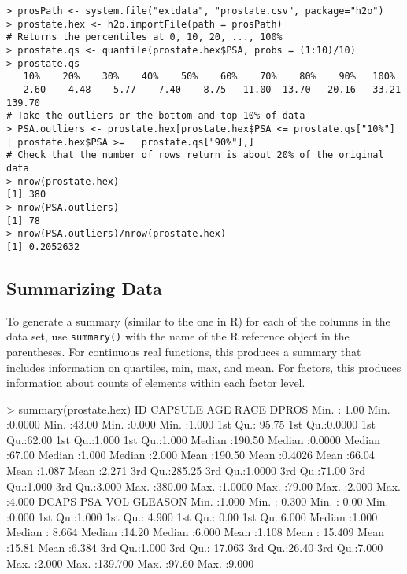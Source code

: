 \begin{lstlisting}[style=R]
> prosPath <- system.file("extdata", "prostate.csv", package="h2o")
> prostate.hex <- h2o.importFile(path = prosPath)
# Returns the percentiles at 0, 10, 20, ..., 100%
> prostate.qs <- quantile(prostate.hex$PSA, probs = (1:10)/10)
> prostate.qs
   10%    20%    30%    40%    50%    60%    70%    80%    90%   100% 
   2.60    4.48    5.77    7.40    8.75   11.00  13.70   20.16   33.21  139.70 
# Take the outliers or the bottom and top 10% of data
> PSA.outliers <- prostate.hex[prostate.hex$PSA <= prostate.qs["10%"] | prostate.hex$PSA >=   prostate.qs["90%"],]
# Check that the number of rows return is about 20% of the original data
> nrow(prostate.hex)
[1] 380
> nrow(PSA.outliers)
[1] 78
> nrow(PSA.outliers)/nrow(prostate.hex)
[1] 0.2052632
\end{lstlisting}


\subsection{Summarizing Data}
To generate a summary (similar to the one in R) for each of the columns in the data set, use {\texttt{summary()}} with the name of the R reference object in the parentheses.
For continuous real functions, this produces a summary that includes information on quartiles, min, max, and mean. 
For factors, this produces information about counts of elements within each factor level. 

\begin{spverbatim}
> summary(prostate.hex)
 ID               CAPSULE          AGE             RACE            DPROS          
 Min.   :  1.00   Min.   :0.0000   Min.   :43.00   Min.   :0.000   Min.   :1.000  
 1st Qu.: 95.75   1st Qu.:0.0000   1st Qu.:62.00   1st Qu.:1.000   1st Qu.:1.000  
 Median :190.50   Median :0.0000   Median :67.00   Median :1.000   Median :2.000  
 Mean   :190.50   Mean   :0.4026   Mean   :66.04   Mean   :1.087   Mean   :2.271  
 3rd Qu.:285.25   3rd Qu.:1.0000   3rd Qu.:71.00   3rd Qu.:1.000   3rd Qu.:3.000  
 Max.   :380.00   Max.   :1.0000   Max.   :79.00   Max.   :2.000   Max.   :4.000  
 DCAPS           PSA               VOL             GLEASON        
 Min.   :1.000   Min.   :  0.300   Min.   : 0.00   Min.   :0.000  
 1st Qu.:1.000   1st Qu.:  4.900   1st Qu.: 0.00   1st Qu.:6.000  
 Median :1.000   Median :  8.664   Median :14.20   Median :6.000  
 Mean   :1.108   Mean   : 15.409   Mean   :15.81   Mean   :6.384  
 3rd Qu.:1.000   3rd Qu.: 17.063   3rd Qu.:26.40   3rd Qu.:7.000  
 Max.   :2.000   Max.   :139.700   Max.   :97.60   Max.   :9.000
 \end{spverbatim}


